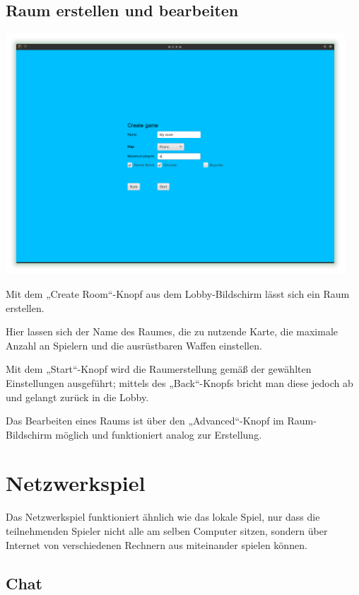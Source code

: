 \documentclass{scrreprt}
\begin{document}
\subsection{Raum erstellen und bearbeiten}

\includegraphics[height=9cm]{Screenshot14.png}

Mit dem „Create Room“-Knopf aus dem Lobby-Bildschirm lässt sich ein Raum erstellen.

Hier lassen sich der Name des Raumes, die zu nutzende Karte, die maximale Anzahl an Spielern und die ausrüstbaren Waffen einstellen.

Mit dem „Start“-Knopf wird die Raumerstellung gemäß der gewählten Einstellungen ausgeführt; mittels des „Back“-Knopfs bricht man diese jedoch ab und gelangt zurück in die Lobby.

Das Bearbeiten eines Raums ist über den „Advanced“-Knopf im Raum-Bildschirm möglich und funktioniert analog zur Erstellung.


\section{Netzwerkspiel}

Das Netzwerkspiel funktioniert ähnlich wie das lokale Spiel, nur dass die teilnehmenden Spieler nicht alle am selben Computer sitzen, sondern über Internet von verschiedenen Rechnern aus miteinander spielen können.

\subsection{Chat}
\end{document}
